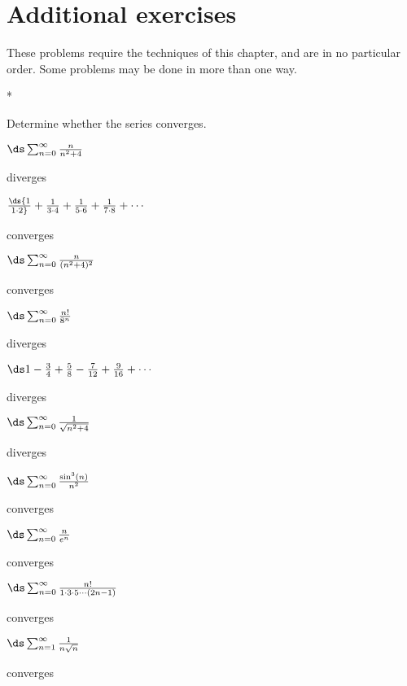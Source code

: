 \section{Additional exercises}{}{}

These problems require the techniques of this chapter, and are in no
particular order. Some problems may be done in more than one way.

\begin{exercises}*

Determine whether the series converges.

\exercise $\ds\sum_{n=0}^\infty {n\over n^2+4}$
\begin{answer} diverges
\end{answer}

\exercise $\ds {1\over 1\cdot 2}+{1\over 3\cdot
  4}+{1\over 5\cdot 6}+{1\over 7\cdot 8}+\cdots$
\begin{answer} converges
\end{answer}

\exercise $\ds\sum_{n=0}^\infty {n\over (n^2+4)^2}$
\begin{answer} converges
\end{answer}

\exercise $\ds\sum_{n=0}^\infty {n!\over 8^n}$
\begin{answer} diverges
\end{answer}

\exercise $\ds 1-{3\over4}+{5\over8}-{7\over12}+{9\over16}+\cdots$
\begin{answer} diverges
\end{answer}

\exercise $\ds\sum_{n=0}^\infty {1\over \sqrt{n^2+4}}$
\begin{answer} diverges
\end{answer}

\exercise $\ds\sum_{n=0}^\infty {\sin^3(n)\over n^2}$
\begin{answer} converges
\end{answer}

\exercise $\ds\sum_{n=0}^\infty {n\over e^n}$
\begin{answer} converges
\end{answer}

\exercise $\ds\sum_{n=0}^\infty {n!\over 1\cdot3\cdot5\cdots(2n-1)}$
\begin{answer} converges
\end{answer}

\exercise $\ds\sum_{n=1}^\infty {1\over n\sqrt n}$
\begin{answer} converges
\end{answer}


\end{exercises}
